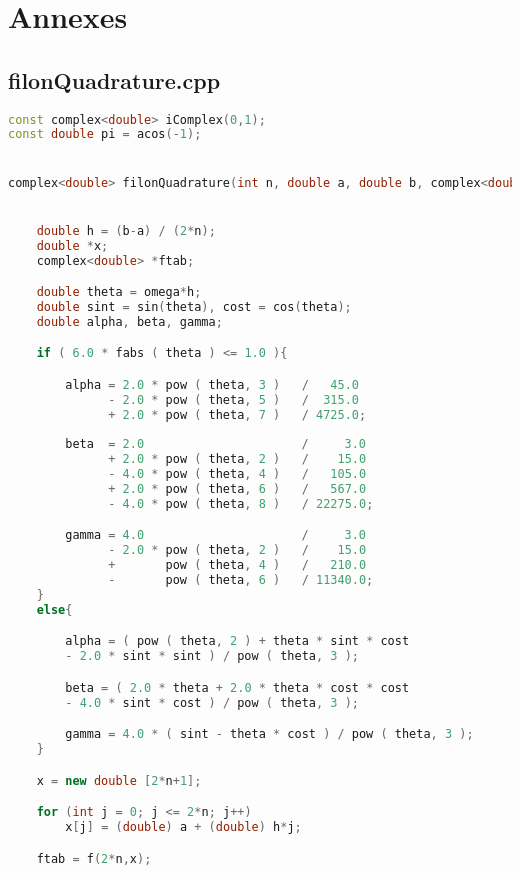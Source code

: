 \chapter{Annexes}



\section{filonQuadrature.cpp}

\begin{lstlisting}[language=C++]
const complex<double> iComplex(0,1);
const double pi = acos(-1);


complex<double> filonQuadrature(int n, double a, double b, complex<double> *f(int n , double x[]), double omega){


    double h = (b-a) / (2*n);
    double *x;
    complex<double> *ftab;

    double theta = omega*h;
    double sint = sin(theta), cost = cos(theta);
    double alpha, beta, gamma;

    if ( 6.0 * fabs ( theta ) <= 1.0 ){

        alpha = 2.0 * pow ( theta, 3 )   /   45.0 
              - 2.0 * pow ( theta, 5 )   /  315.0 
              + 2.0 * pow ( theta, 7 )   / 4725.0;
    
        beta  = 2.0                      /     3.0 
              + 2.0 * pow ( theta, 2 )   /    15.0 
              - 4.0 * pow ( theta, 4 )   /   105.0 
              + 2.0 * pow ( theta, 6 )   /   567.0 
              - 4.0 * pow ( theta, 8 )   / 22275.0;

        gamma = 4.0                      /     3.0 
              - 2.0 * pow ( theta, 2 )   /    15.0 
              +       pow ( theta, 4 )   /   210.0 
              -       pow ( theta, 6 )   / 11340.0;
    }
    else{

        alpha = ( pow ( theta, 2 ) + theta * sint * cost 
        - 2.0 * sint * sint ) / pow ( theta, 3 );

        beta = ( 2.0 * theta + 2.0 * theta * cost * cost
        - 4.0 * sint * cost ) / pow ( theta, 3 );

        gamma = 4.0 * ( sint - theta * cost ) / pow ( theta, 3 );
    }

    x = new double [2*n+1];

    for (int j = 0; j <= 2*n; j++)
        x[j] = (double) a + (double) h*j; 

    ftab = f(2*n,x); 
    

\end{lstlisting}
